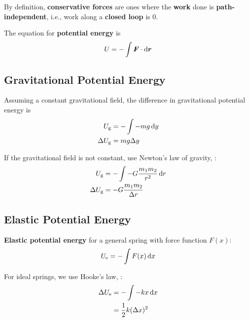 \documentclass[a4paper, titlepage]{book}
\begin{document}
By definition, \textbf{conservative forces} are ones where the \textbf{work} done is \textbf{path-independent},
i.e., work along a \textbf{closed loop} is 0.

The equation for \textbf{potential energy} is
\begin{equation} \label{eq:potential-energy}
    U = - \int \bm{F} \cdot \odif{\bm{r}}
\end{equation}

\subsection{Gravitational Potential Energy}

Assuming a constant gravitational field,
the difference in gravitational potential energy is
\begin{equation}
    \begin{aligned}
        U_\mathrm{g} &= - \int -mg \odif{y} \\
        \Delta{U_\mathrm{g}} &= mg \Delta{y}
    \end{aligned}
\end{equation}

If the gravitational field is not constant, use Newton's law of gravity, :
\begin{equation}
    \begin{aligned}
        U_\mathrm{g} &= - \int -G \frac{m_1 m_2}{r^2} \odif{r} \\
        \Delta{U_\mathrm{g}} &= -G \frac{m_1 m_2}{\Delta{r}}
    \end{aligned}
\end{equation}

\subsection{Elastic Potential Energy}

\textbf{Elastic potential energy} for a general spring with force function \(F(x)\):
\begin{equation} \label{eq:general-elastic-potential-energy}
    \begin{aligned}
        U_\mathrm{e} &= - \int F(x) \odif{x} \\
    \end{aligned}
\end{equation}

For ideal springs, we use Hooke's law, :
\begin{equation}
    \begin{aligned}
        \Delta{U_\mathrm{e}} &= - \int -kx \odif{x} \\
        &= \frac{1}{2} k (\Delta{x})^2
    \end{aligned}
\end{equation}
\end{document}
